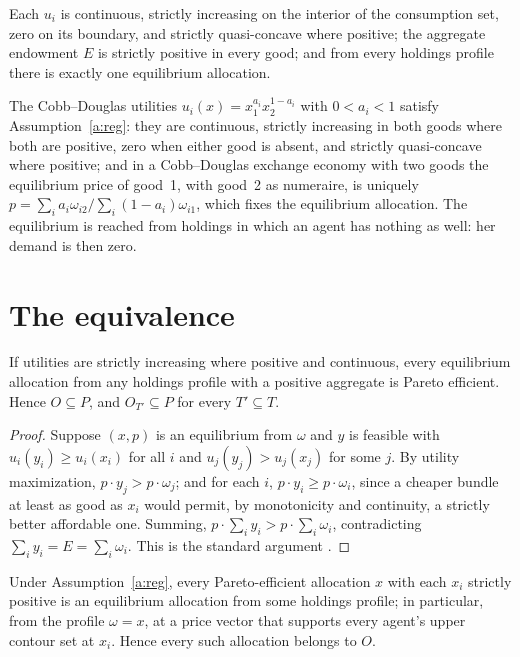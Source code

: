 \documentclass{situationist-preprint}
\begin{document}
\begin{assumption}[Regularity]\label{a:reg}
Each $u_i$ is continuous, strictly increasing on the interior of the consumption set, zero on its boundary, and strictly quasi-concave where positive; the aggregate endowment $E$ is strictly positive in every good; and from every holdings profile there is exactly one equilibrium allocation.
\end{assumption}

The Cobb--Douglas utilities $u_i(x) = x_1^{a_i} x_2^{1 - a_i}$ with $0 < a_i < 1$ satisfy Assumption~\ref{a:reg}: they are continuous, strictly increasing in both goods where both are positive, zero when either good is absent, and strictly quasi-concave where positive; and in a Cobb--Douglas exchange economy with two goods the equilibrium price of good~1, with good~2 as numeraire, is uniquely $p = \sum_i a_i \omega_{i2} / \sum_i (1 - a_i)\omega_{i1}$, which fixes the equilibrium allocation. The equilibrium is reached from holdings in which an agent has nothing as well: her demand is then zero.

\section{The equivalence}\label{s:proof}

\begin{lemma}\label{l:fwt}
If utilities are strictly increasing where positive and continuous, every equilibrium allocation from any holdings profile with a positive aggregate is Pareto efficient. Hence $O \subseteq P$, and $O_{T'} \subseteq P$ for every $T' \subseteq T$.
\end{lemma}

\begin{proof}
Suppose $(x, p)$ is an equilibrium from $\omega$ and $y$ is feasible with $u_i(y_i) \geq u_i(x_i)$ for all $i$ and $u_j(y_j) > u_j(x_j)$ for some $j$. By utility maximization, $p \cdot y_j > p \cdot \omega_j$; and for each $i$, $p \cdot y_i \geq p \cdot \omega_i$, since a cheaper bundle at least as good as $x_i$ would permit, by monotonicity and continuity, a strictly better affordable one. Summing, $p \cdot \sum_i y_i > p \cdot \sum_i \omega_i$, contradicting $\sum_i y_i = E = \sum_i \omega_i$. This is the standard argument \citep{Arrow1951,Debreu1959}.
\end{proof}

\begin{lemma}\label{l:swt}
Under Assumption~\ref{a:reg}, every Pareto-efficient allocation $x$ with each $x_i$ strictly positive is an equilibrium allocation from some holdings profile; in particular, from the profile $\omega = x$, at a price vector that supports every agent's upper contour set at $x_i$. Hence every such allocation belongs to $O$.
\end{lemma}
\end{document}
